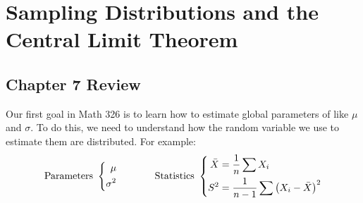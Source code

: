 \chapter{Sampling Distributions and the Central Limit Theorem}
\section*{Chapter 7 Review}

Our first goal in Math 326 is to learn how to estimate global parameters of  like $\mu$ and $\sigma$. To do this, we need to understand how the random variable we use to estimate them are distributed. For example:
$$
\text{Parameters }\left\{\begin{aligned}
    \mu
    \\
    \sigma^2
\end{aligned}\right.
\hspace{0.5in}\text{Statistics }
\left\{\begin{aligned}
    \Xbar &= \over{n} \sum X_i
    \\
    S^2 &= \over{n-1} \sum \pars{X_i - \Xbar}^2
\end{aligned}\right.
$$



\newpage
